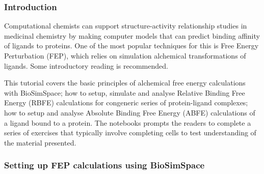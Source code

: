 
\subsubsection{Introduction}


Computational chemists can support structure-activity relationship
studies in medicinal chemistry by making computer models that can
predict binding affinity of ligands to proteins. One of the most popular
techniques for this is Free Energy Perturbation (FEP), which relies on simulation alchemical transformations of ligands. Some
introductory reading is recommended. \cite{mey2020best, cournia_allen_sherman_2017, kuhn_firth-clark_tosco_mey_mackey_michel_2020}

This tutorial covers the basic principles of alchemical free energy calculations with BioSimSpace; how to setup, simulate and analyse Relative Binding Free Energy (RBFE) calculations for congeneric series of protein-ligand complexes; how to setup and analyse Absolute Binding Free Energy (ABFE) calculations of a ligand bound to a protein.  
The notebooks prompts the readers to complete a series of exercises that typically involve completing cells to test understanding of the material presented. 

\subsubsection{Setting up FEP calculations using BioSimSpace}

